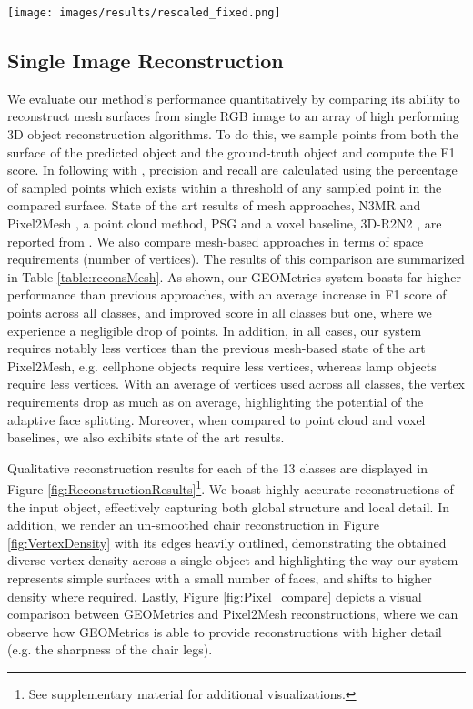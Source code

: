 \documentclass{article}
\begin{document}
\begin{figure*}[ht!]
\centering
\texttt{[image: images/results/rescaled\_fixed.png]}
\vspace{-0.4cm}
\caption{Qualitative results: renderings of meshes reconstructed from each ShapeNet object classes.} \label{fig:ReconstructionResults}
\vspace{-0.2cm}
\end{figure*}

\subsection{Single Image Reconstruction}

We evaluate our method's performance quantitatively by comparing its ability to reconstruct mesh surfaces from single RGB image to an array of high performing 3D object reconstruction algorithms. To do this, we sample points from both the surface of the predicted object and the ground-truth object and compute the F1 score. In following with \cite{Pixel2Mesh}, precision and recall are calculated using the percentage of sampled points which exists within a threshold of  any sampled point in the compared surface. State of the art results of mesh approaches, N3MR \cite{kato2017neural} and Pixel2Mesh \cite{Pixel2Mesh}, a point cloud method, PSG \cite{fan2017point} and a voxel baseline, 3D-R2N2 \cite{choy20163d}, are reported from \citet{Pixel2Mesh}. We also compare mesh-based approaches in terms of space requirements (number of vertices). The results of this comparison are summarized in Table \ref{table:reconsMesh}. As shown, our GEOMetrics system boasts far higher performance than previous approaches, with an average increase in F1 score of  points across all classes, and improved score in all classes but one, where we experience a negligible drop of  points. In addition, in all cases, our system requires notably less vertices than the previous mesh-based state of the art Pixel2Mesh, e.g. cellphone objects require  less vertices, whereas lamp objects require  less vertices. With an average of  vertices used across all classes, the vertex requirements drop as much as  on average, highlighting the potential of the adaptive face splitting. Moreover, when compared to point cloud and voxel baselines, we also exhibits state of the art results.

Qualitative reconstruction results for each of the 13 classes are displayed in Figure \ref{fig:ReconstructionResults}\footnote{See supplementary material for additional visualizations.}. We boast highly accurate reconstructions of the input object, effectively capturing both global structure and local detail. In addition, we render an un-smoothed chair reconstruction in Figure \ref{fig:VertexDensity} with its edges heavily outlined, demonstrating the obtained diverse vertex density across a single object and highlighting the way our system represents simple surfaces with a small number of faces, and shifts to higher density where required. Lastly, Figure \ref{fig:Pixel_compare} depicts a visual comparison between GEOMetrics and Pixel2Mesh reconstructions, where we can observe how GEOMetrics is able to provide reconstructions with higher detail (e.g. the sharpness of the chair legs). 
\end{document}
